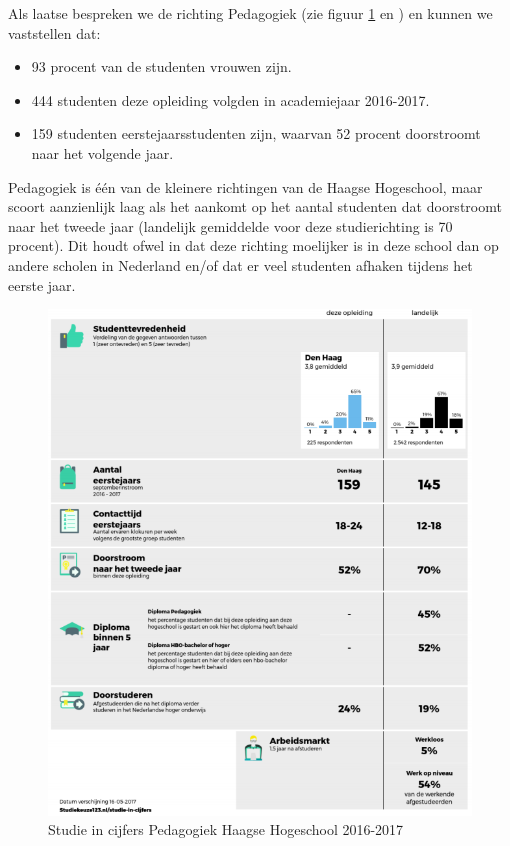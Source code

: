 Als laatse bespreken we de richting Pedagogiek (zie figuur \ref{fig:pedagogiek} en \textcite{Studiekeuze2017}) en kunnen we vaststellen dat:
\begin{itemize}
	\item 93 procent van de studenten vrouwen zijn.
	\item 444 studenten deze opleiding volgden in academiejaar 2016-2017.
	\item 159 studenten eerstejaarsstudenten zijn, waarvan 52 procent doorstroomt naar het volgende jaar.
\end{itemize}

Pedagogiek is één van de kleinere richtingen van de Haagse Hogeschool, maar scoort aanzienlijk laag als het aankomt op het aantal studenten dat doorstroomt naar het tweede jaar (landelijk gemiddelde voor deze studierichting is 70 procent). Dit houdt ofwel in dat deze richting moelijker is in deze school dan op andere scholen in Nederland en/of dat er veel studenten afhaken tijdens het eerste jaar. 

\begin{figure}
	\includegraphics[width=\textwidth]
	{img/pedagogiek.png}
	\caption{Studie in cijfers Pedagogiek Haagse Hogeschool 2016-2017}
	\label{fig:pedagogiek}
\end{figure}

